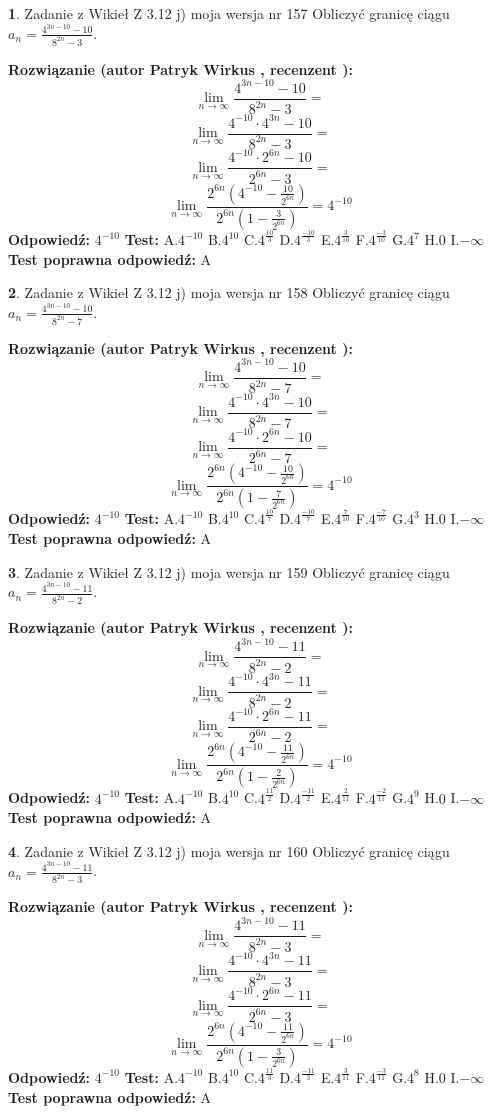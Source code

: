 \documentclass[12pt, a4paper]{article}
\theoremstyle{definition} %
\newtheorem{zad}{}
\newcommand{\zadStart}[1]{\begin{zad}#1\newline}
\newcommand{\zadStop}{\end{zad}}
\newcommand{\rozwStart}[2]{\noindent \textbf{Rozwiązanie (autor #1 , recenzent #2): }\newline}
\newcommand{\rozwStop}{\newline}
\newcommand{\odpStart}{\noindent \textbf{Odpowiedź:}\newline}
\newcommand{\odpStop}{\newline}
\newcommand{\testStart}{\noindent \textbf{Test:}\newline}
\newcommand{\testStop}{\newline}
\newcommand{\kluczStart}{\noindent \textbf{Test poprawna odpowiedź:}\newline}
\newcommand{\kluczStop}{\newline}
\begin{document}
\zadStart{Zadanie z Wikieł Z 3.12 j) moja wersja nr 157}
Obliczyć granicę ciągu $a_{n}=\frac{4^{3n-10}-10}{8^{2n}-3}$.
\zadStop
\rozwStart{Patryk Wirkus}{}
$$\lim\limits_{n\to\infty}\frac{4^{3n-10}-10}{8^{2n}-3}=$$
$$\lim\limits_{n\to\infty}\frac{4^{-10} \cdot 4^{3n}-10}{8^{2n}-3}=$$
$$\lim\limits_{n\to\infty}\frac{4^{-10} \cdot 2^{6n}-10}{2^{6n}-3}=$$
$$\lim\limits_{n\to\infty}\frac{2^{6n}(4^{-10} - \frac{10}{2^{6n}})}{2^{6n}(1-\frac{3}{2^{6n}})}= 4^{-10}$$
\rozwStop
\odpStart
$4^{-10}$
\odpStop
\testStart
A.$4^{-10}$
B.$4^{10}$
C.$4^{\frac{10}{3}}$
D.$4^{\frac{-10}{3}}$
E.$4^{\frac{3}{10}}$
F.$4^{\frac{-3}{10}}$
G.$4^{7}$
H.$0$
I.$-\infty$
\testStop
\kluczStart
A
\kluczStop



\zadStart{Zadanie z Wikieł Z 3.12 j) moja wersja nr 158}
Obliczyć granicę ciągu $a_{n}=\frac{4^{3n-10}-10}{8^{2n}-7}$.
\zadStop
\rozwStart{Patryk Wirkus}{}
$$\lim\limits_{n\to\infty}\frac{4^{3n-10}-10}{8^{2n}-7}=$$
$$\lim\limits_{n\to\infty}\frac{4^{-10} \cdot 4^{3n}-10}{8^{2n}-7}=$$
$$\lim\limits_{n\to\infty}\frac{4^{-10} \cdot 2^{6n}-10}{2^{6n}-7}=$$
$$\lim\limits_{n\to\infty}\frac{2^{6n}(4^{-10} - \frac{10}{2^{6n}})}{2^{6n}(1-\frac{7}{2^{6n}})}= 4^{-10}$$
\rozwStop
\odpStart
$4^{-10}$
\odpStop
\testStart
A.$4^{-10}$
B.$4^{10}$
C.$4^{\frac{10}{7}}$
D.$4^{\frac{-10}{7}}$
E.$4^{\frac{7}{10}}$
F.$4^{\frac{-7}{10}}$
G.$4^{3}$
H.$0$
I.$-\infty$
\testStop
\kluczStart
A
\kluczStop



\zadStart{Zadanie z Wikieł Z 3.12 j) moja wersja nr 159}
Obliczyć granicę ciągu $a_{n}=\frac{4^{3n-10}-11}{8^{2n}-2}$.
\zadStop
\rozwStart{Patryk Wirkus}{}
$$\lim\limits_{n\to\infty}\frac{4^{3n-10}-11}{8^{2n}-2}=$$
$$\lim\limits_{n\to\infty}\frac{4^{-10} \cdot 4^{3n}-11}{8^{2n}-2}=$$
$$\lim\limits_{n\to\infty}\frac{4^{-10} \cdot 2^{6n}-11}{2^{6n}-2}=$$
$$\lim\limits_{n\to\infty}\frac{2^{6n}(4^{-10} - \frac{11}{2^{6n}})}{2^{6n}(1-\frac{2}{2^{6n}})}= 4^{-10}$$
\rozwStop
\odpStart
$4^{-10}$
\odpStop
\testStart
A.$4^{-10}$
B.$4^{10}$
C.$4^{\frac{11}{2}}$
D.$4^{\frac{-11}{2}}$
E.$4^{\frac{2}{11}}$
F.$4^{\frac{-2}{11}}$
G.$4^{9}$
H.$0$
I.$-\infty$
\testStop
\kluczStart
A
\kluczStop



\zadStart{Zadanie z Wikieł Z 3.12 j) moja wersja nr 160}
Obliczyć granicę ciągu $a_{n}=\frac{4^{3n-10}-11}{8^{2n}-3}$.
\zadStop
\rozwStart{Patryk Wirkus}{}
$$\lim\limits_{n\to\infty}\frac{4^{3n-10}-11}{8^{2n}-3}=$$
$$\lim\limits_{n\to\infty}\frac{4^{-10} \cdot 4^{3n}-11}{8^{2n}-3}=$$
$$\lim\limits_{n\to\infty}\frac{4^{-10} \cdot 2^{6n}-11}{2^{6n}-3}=$$
$$\lim\limits_{n\to\infty}\frac{2^{6n}(4^{-10} - \frac{11}{2^{6n}})}{2^{6n}(1-\frac{3}{2^{6n}})}= 4^{-10}$$
\rozwStop
\odpStart
$4^{-10}$
\odpStop
\testStart
A.$4^{-10}$
B.$4^{10}$
C.$4^{\frac{11}{3}}$
D.$4^{\frac{-11}{3}}$
E.$4^{\frac{3}{11}}$
F.$4^{\frac{-3}{11}}$
G.$4^{8}$
H.$0$
I.$-\infty$
\testStop
\kluczStart
A
\kluczStop
\end{document}
